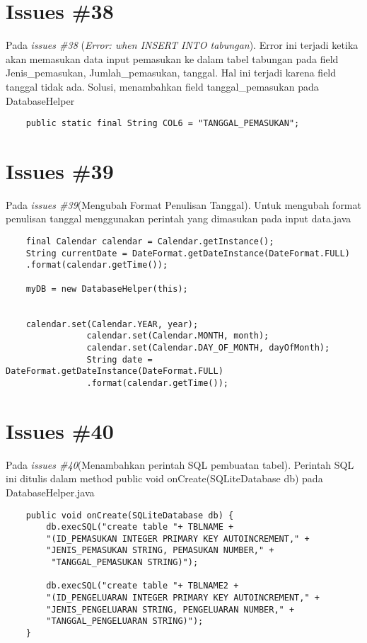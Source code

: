 \section{Issues \#38}
Pada \textit{issues \#38} (\textit{Error: when INSERT INTO tabungan}). Error ini terjadi ketika akan memasukan data input pemasukan ke dalam tabel tabungan pada field Jenis\_pemasukan, Jumlah\_pemasukan, tanggal. Hal ini terjadi karena field tanggal tidak ada.
Solusi, menambahkan field tanggal\_pemasukan pada DatabaseHelper
\begin{verbatim}
    public static final String COL6 = "TANGGAL_PEMASUKAN";
\end{verbatim}

\section{Issues \#39}
Pada \textit{issues \#39}(Mengubah Format Penulisan Tanggal). Untuk mengubah format penulisan tanggal menggunakan perintah yang dimasukan pada input data.java
\begin{verbatim}
    final Calendar calendar = Calendar.getInstance();
    String currentDate = DateFormat.getDateInstance(DateFormat.FULL)
    .format(calendar.getTime());

    myDB = new DatabaseHelper(this);


    calendar.set(Calendar.YEAR, year);
                calendar.set(Calendar.MONTH, month);
                calendar.set(Calendar.DAY_OF_MONTH, dayOfMonth);
                String date = DateFormat.getDateInstance(DateFormat.FULL)
                .format(calendar.getTime());
\end{verbatim}

\section{Issues \#40}
Pada \textit{issues \#40}(Menambahkan perintah SQL pembuatan tabel). Perintah SQL ini ditulis dalam method public void onCreate(SQLiteDatabase db) pada DatabaseHelper.java
\begin{verbatim}
    public void onCreate(SQLiteDatabase db) {
        db.execSQL("create table "+ TBLNAME +
        "(ID_PEMASUKAN INTEGER PRIMARY KEY AUTOINCREMENT," + 
        "JENIS_PEMASUKAN STRING, PEMASUKAN NUMBER," +
         "TANGGAL_PEMASUKAN STRING)");

        db.execSQL("create table "+ TBLNAME2 +
        "(ID_PENGELUARAN INTEGER PRIMARY KEY AUTOINCREMENT," +
        "JENIS_PENGELUARAN STRING, PENGELUARAN NUMBER," + 
        "TANGGAL_PENGELUARAN STRING)");
    }
\end{verbatim}